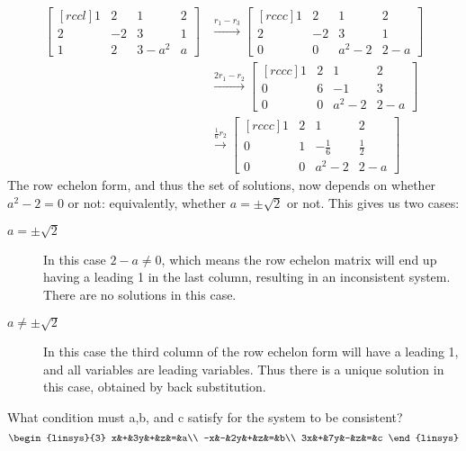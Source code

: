 \begin{solution}
\begin{eqnarray*}
\begin{bmatrix}[rccl]
1&2&1&2\\
2&-2&3&1\\
1&2&3-a^2&a
\end{bmatrix}
&\xrightarrow[]{r_1 - r_3}
\begin{bmatrix}[rccc]
1&2&1&2\\
2&-2&3&1\\
0&0&a^2-2&2-a
\end{bmatrix}\\
&\xrightarrow[]{2r_1 - r_2}
\begin{bmatrix}[rccc]
1&2&1&2\\
0&6&-1&3\\
0&0&a^2-2&2-a
\end{bmatrix}\\
&\xrightarrow[]{\frac{1}{6}r_2}
\begin{bmatrix}[rccc]
1&2&1&2\\
0&1&-\frac{1}{6}&\frac{1}{2}\\
0&0&a^2-2&2-a
\end{bmatrix}
\end{eqnarray*}
\newline
The row echelon form, and thus the set of solutions, now depends on whether $a^2-2=0$ or not: equivalently, whether $a=\pm\sqrt{2}$ or not. This gives us two cases:
\begin{description}
\item[$a=\pm\sqrt{2}$] In this case $2-a\ne 0$, which means the row echelon matrix will end up having a leading 1 in the last column, resulting in an inconsistent system. There are no solutions in this case. 
\item[$a\ne \pm\sqrt{2}$] In this case the third column of the row echelon form will have a leading 1, and all variables are leading variables. Thus there is a unique solution in this case, obtained by back substitution. 
\end{description}
\end{solution}
\ii\noindent
What condition must a,b, and c satisfy for the system to be consistent?
\[
\begin{linsys}{3}
x&+&3y&+&z&=&a\\
-x&-&2y&+&z&=&b\\
3x&+&7y&-&z&=&c
\end{linsys}
\]
 
